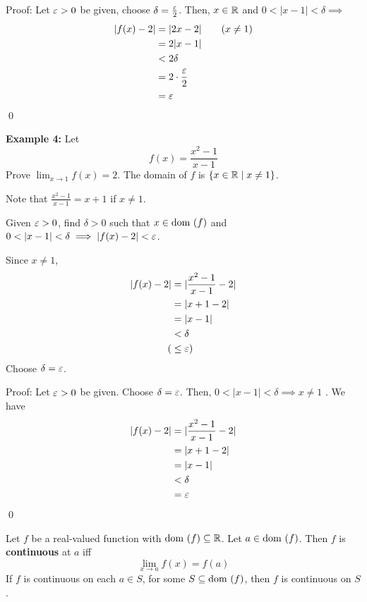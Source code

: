 \documentclass{article}
\begin{document}
\begin{examples}
Proof:
Let $\varepsilon > 0$ be given, choose $\delta = \frac{\varepsilon}{2}$. Then, $x \in \mathbb{R}$ and $0 < |x-1| < \delta \implies$
\begin{align*}
    |f(x)-2| &= |2x-2| \tag{$x \not = 1$}\\
    &= 2|x-1|\\
    &< 2\delta\\
    &= 2 \cdot \frac{\varepsilon}{2}\\
    &= \varepsilon\\
\end{align*}
\qed

\textbf{Example 4:}\newline
Let \[
f(x) = \frac{x^2-1}{x-1}
\]
Prove $\lim_{x\to 1} f(x) = 2$.
The domain of $f$ is $\{x \in \mathbb{R} \mid x \not = 1\}$.

Note that $\frac{x^2-1}{x-1} = x+1$ if $x\not=1$.

Given $\varepsilon > 0$, find $\delta > 0$ such that $x\in \text{dom }(f)$ and $0 < |x-1| < \delta \implies |f(x) - 2| < \varepsilon$.

Since $x \not = 1$, 
\begin{align*}
    |f(x)-2| &= |\frac{x^2-1}{x-1} - 2|\\
    &= |x+1 - 2|\\
    &= |x-1|\\
    &< \delta\\
    (&\leq \varepsilon)\\
\end{align*}
Choose $\delta = \varepsilon$.

Proof:
Let $\varepsilon > 0$ be given. Choose $\delta = \varepsilon$. Then, $0 < |x-1| < \delta \implies x \not = 1$ .
We have \begin{align*}
    |f(x)-2| &= |\frac{x^2-1}{x-1} - 2|\\
    &= |x+1 - 2|\\
    &= |x-1|\\
    &< \delta\\
    &= \varepsilon
\end{align*}
\qed
\end{examples}
\begin{definition}
Let $f$ be a real-valued function with $\text{dom }(f) \subseteq \mathbb{R}$. Let $a \in \text{dom }(f)$. Then $f$ is \textbf{continuous} at $a$ iff \[
\lim_{x\to a}f(x) = f(a)\]
If $f$ is continuous on each $a \in S$, for some $S \subseteq \text{dom }(f)$, then $f$ is continuous on $S$.
\end{definition}
\end{document}
